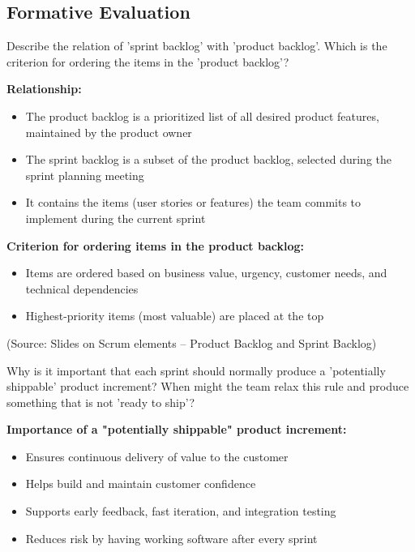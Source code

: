 \documentclass[12pt]{article}
\begin{document}
\subsection{Formative Evaluation}

\begin{questionbox}
Describe the relation of 'sprint backlog' with 'product backlog'. Which is the criterion for ordering the items in the 'product backlog'?
\end{questionbox}

\textbf{Relationship:}
\begin{itemize}
    \item The product backlog is a prioritized list of all desired product features, maintained by the product owner
    \item The sprint backlog is a subset of the product backlog, selected during the sprint planning meeting
    \item It contains the items (user stories or features) the team commits to implement during the current sprint
\end{itemize}

\textbf{Criterion for ordering items in the product backlog:}
\begin{itemize}
    \item Items are ordered based on business value, urgency, customer needs, and technical dependencies
    \item Highest-priority items (most valuable) are placed at the top
\end{itemize}

(Source: Slides on Scrum elements – Product Backlog and Sprint Backlog)

\begin{questionbox}
Why is it important that each sprint should normally produce a 'potentially shippable' product increment? When might the team relax this rule and produce something that is not 'ready to ship'?
\end{questionbox}

\textbf{Importance of a "potentially shippable" product increment:}
\begin{itemize}
    \item Ensures continuous delivery of value to the customer
    \item Helps build and maintain customer confidence
    \item Supports early feedback, fast iteration, and integration testing
    \item Reduces risk by having working software after every sprint
\end{itemize}
\end{document}
